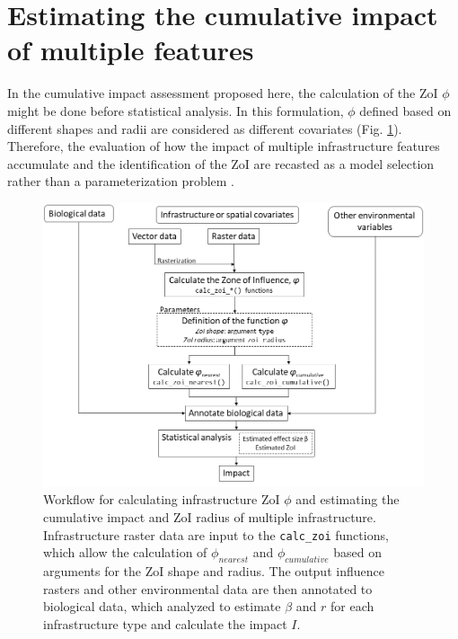 \documentclass[titlepage]{article}
\begin{document}
\section{Estimating the cumulative impact of multiple features}

In the cumulative impact assessment proposed here, the calculation of the ZoI $\phi$ might be done before statistical analysis. In this formulation, $\phi$ defined based on different shapes and radii are considered as different covariates (Fig. \ref{fig:workflow}). Therefore, the evaluation of how the impact of multiple infrastructure features accumulate and the identification of the ZoI are recasted as a model selection rather than a parameterization problem \citep[such as in][]{lee_estimating_2020}.

\begin{figure}[h]
\centering
\includegraphics[width=1.3\textwidth,center]{figures/figure_workflow.png}
\caption{\label{fig:workflow} Workflow for calculating infrastructure ZoI $\phi$ and estimating the cumulative impact and ZoI radius of multiple infrastructure. Infrastructure raster data are input to the \texttt{calc\_zoi} functions, which allow the calculation 
of $\phi_{nearest}$ and $\phi_{cumulative}$ based on arguments for the ZoI shape and radius. The output influence rasters and other environmental data are then annotated to biological data, which analyzed to estimate $\beta$ and $r$ for each infrastructure type and calculate the impact $I$.}
\end{figure}
\end{document}
